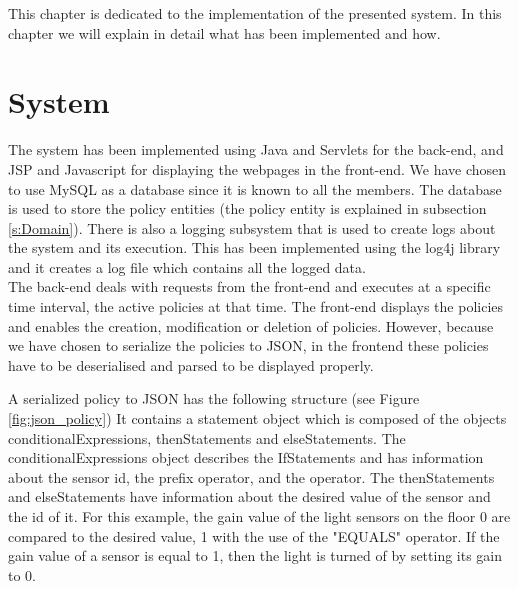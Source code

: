 This chapter is dedicated to the implementation of the presented system. In this chapter we will explain in detail what has been implemented and how. 

\section{System}
The system has been implemented using Java and Servlets for the back-end, and JSP and Javascript for displaying the webpages in the front-end. We have chosen to use MySQL as a database since it is known to all the members. The database is used to store the policy entities (the policy entity is explained in subsection \ref{s:Domain}). There is also a logging subsystem that is used to create logs about the system and its execution. This has been implemented using the log4j library and it creates a log file which contains all the logged data. 
\\The back-end deals with requests from the front-end and executes at a specific time interval, the active policies at that time. The front-end displays the policies and enables the creation, modification or deletion of policies. However, because we have chosen to serialize the policies to JSON, in the frontend these policies have to be deserialised and parsed to be displayed properly. 

A serialized policy to JSON has the following structure (see Figure \ref{fig:json_policy})
It contains a statement object which is composed of the objects conditionalExpressions, thenStatements and elseStatements. 
The conditionalExpressions object describes the IfStatements and has information about the sensor id, the prefix operator, and the operator. The thenStatements and elseStatements have information about the desired value of the sensor and the id of it. 
For this example, the gain value of the light sensors on the floor 0 are compared to the desired value, 1 with the use of the "EQUALS" operator. If the gain value of a sensor is equal to 1, then the light is turned of by setting its gain to 0. 

